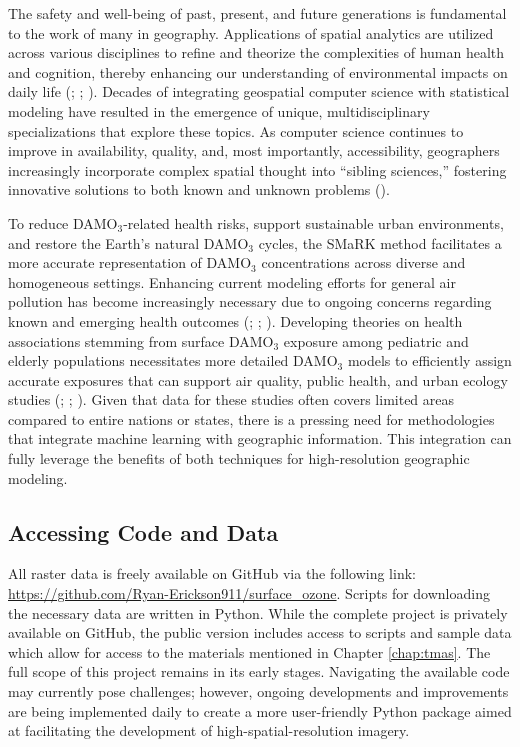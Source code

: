 The safety and well-being of past, present, and future generations is fundamental to the work of many in geography. Applications of spatial analytics are utilized across various disciplines to refine and theorize the complexities of human health and cognition, thereby enhancing our understanding of environmental impacts on daily life (\cite{jerrett2009}; \cite{greenough_beyond_2019}; \cite{nawaz_source_2023}). Decades of integrating geospatial computer science with statistical modeling have resulted in the emergence of unique, multidisciplinary specializations that explore these topics. As computer science continues to improve in availability, quality, and, most importantly, accessibility, geographers increasingly incorporate complex spatial thought into “sibling sciences,” fostering innovative solutions to both known and unknown problems (\cite{goodchild_sharing_2007}). 

To reduce DAMO$_3$-related health risks, support sustainable urban environments, and restore the Earth’s natural DAMO$_3$ cycles, the SMaRK method facilitates a more accurate representation of DAMO$_3$ concentrations across diverse and homogeneous settings. Enhancing current modeling efforts for general air pollution has become increasingly necessary due to ongoing concerns regarding known and emerging health outcomes (\cite{im_present-day_2023}; \cite{sofen_how_2015}; \cite{yan_impacts_2023}). Developing theories on health associations stemming from surface DAMO$_3$ exposure among pediatric and elderly populations necessitates more detailed DAMO$_3$ models to efficiently assign accurate exposures that can support air quality, public health, and urban ecology studies (\cite{deng_effects_2023}; \cite{li_double_2023}; \cite{shin_air_2018}). Given that data for these studies often covers limited areas compared to entire nations or states, there is a pressing need for methodologies that integrate machine learning with geographic information. This integration can fully leverage the benefits of both techniques for high-resolution geographic modeling. 

\subsection{Accessing Code and Data} \label{clcsn:access} All raster data is freely available on GitHub via the following link: \url{https://github.com/Ryan-Erickson911/surface_ozone}. Scripts for downloading the necessary data are written in Python. While the complete project is privately available on GitHub, the public version includes access to scripts and sample data which allow for access to the materials mentioned in Chapter \ref{chap:tmas}. The full scope of this project remains in its early stages. Navigating the available code may currently pose challenges; however, ongoing developments and improvements are being implemented daily to create a more user-friendly Python package aimed at facilitating the development of high-spatial-resolution imagery.